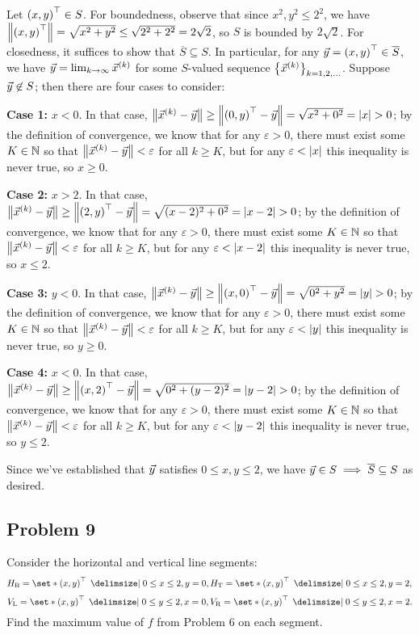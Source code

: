 \documentclass[main.tex]{subfiles}
\begin{document}
\begin{soln}
    Let $\left( x, y \right)^\top\in S$. For boundedness, observe that since $x^2, y^2 \le 2^2$, we have $\left\lVert \left( x, y \right)^\top \right\rVert = \sqrt{x^2 + y^2} \le \sqrt{2^2 + 2^2} = 2\sqrt{2}$, so $S$ is bounded by $2\sqrt{2}$. For closedness, it suffices to show that $\overline{S}\subseteq S$. In particular, for any $\vec{y} = \left( x, y \right)^\top\in \overline{S}$, we have $\vec{y} = \lim_{k\to \infty} \vec{x}^{(k)}$ for some $S$-valued sequence $\left\{ \vec{x}^{(k)} \right\}_{k = 1, 2, \ldots}$. Suppose $\vec{y} \not\in S$; then there are four cases to consider:

    \textbf{Case 1:} $x < 0$. In that case, $\left\lVert \vec{x}^{(k)} - \vec{y} \right\rVert \ge \left\lVert \left( 0, y \right)^\top - \vec{y} \right\rVert = \sqrt{x^2 + 0^2} = \left\lvert x \right\rvert > 0$; by the definition of convergence, we know that for any $\varepsilon > 0$, there must exist some $K\in \mathbb N$ so that $\left\lVert \vec{x}^{(k)} - \vec{y} \right\rVert < \varepsilon$ for all $k \ge K$, but for any $\varepsilon < \left\lvert x \right\rvert$ this inequality is never true, so $x \ge 0$.

    \textbf{Case 2:} $x > 2$. In that case, $\left\lVert \vec{x}^{(k)} - \vec{y} \right\rVert \ge \left\lVert \left( 2, y \right)^\top - \vec{y} \right\rVert = \sqrt{(x - 2)^2 + 0^2} = \left\lvert x - 2 \right\rvert > 0$; by the definition of convergence, we know that for any $\varepsilon > 0$, there must exist some $K\in \mathbb N$ so that $\left\lVert \vec{x}^{(k)} - \vec{y} \right\rVert < \varepsilon$ for all $k \ge K$, but for any $\varepsilon < \left\lvert x - 2 \right\rvert$ this inequality is never true, so $x \le 2$.

    \textbf{Case 3:} $y < 0$. In that case, $\left\lVert \vec{x}^{(k)} - \vec{y} \right\rVert \ge \left\lVert \left( x, 0 \right)^\top - \vec{y} \right\rVert = \sqrt{0^2 + y^2} = \left\lvert y \right\rvert > 0$; by the definition of convergence, we know that for any $\varepsilon > 0$, there must exist some $K\in \mathbb N$ so that $\left\lVert \vec{x}^{(k)} - \vec{y} \right\rVert < \varepsilon$ for all $k \ge K$, but for any $\varepsilon < \left\lvert y \right\rvert$ this inequality is never true, so $y \ge 0$.

    \textbf{Case 4:} $x < 0$. In that case, $\left\lVert \vec{x}^{(k)} - \vec{y} \right\rVert \ge \left\lVert \left( x, 2 \right)^\top - \vec{y} \right\rVert = \sqrt{0^2 + (y - 2)^2} = \left\lvert y - 2 \right\rvert > 0$; by the definition of convergence, we know that for any $\varepsilon > 0$, there must exist some $K\in \mathbb N$ so that $\left\lVert \vec{x}^{(k)} - \vec{y} \right\rVert < \varepsilon$ for all $k \ge K$, but for any $\varepsilon < \left\lvert y - 2 \right\rvert$ this inequality is never true, so $y \le 2$.

    Since we've established that $\vec{y}$ satisfies $0\le x, y \le 2$, we have $\vec{y}\in S\implies \overline{S}\subseteq S$ as desired.
\end{soln}
\eject

\subsection{Problem 9}
\begin{claim}
    Consider the horizontal and vertical line segments:
    \[H_{\mathrm B} = \set*{\parens{x,y}^\top \mid 0 \le x \le 2, y = 0}, H_{\mathrm T} = \set*{\parens{x,y}^\top \mid 0 \le x \le 2, y = 2},\]
    \[V_{\mathrm L} = \set*{\parens{x,y}^\top \mid 0 \le y \le 2, x = 0}, V_{\mathrm R} = \set*{\parens{x,y}^\top \mid 0 \le y \le 2, x = 2}.\]
    Find the maximum value of $f$ from Problem 6 on each segment.
\end{claim}
\end{document}
